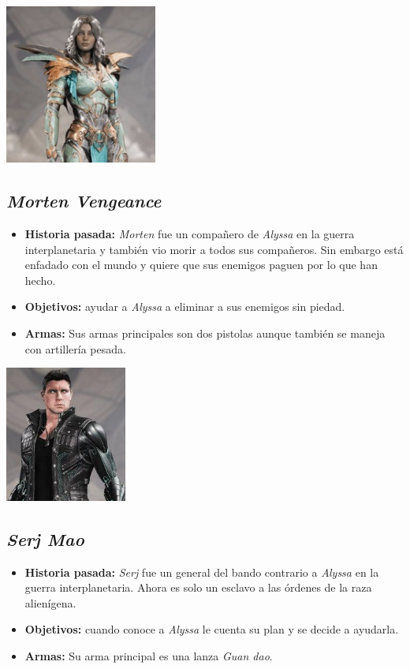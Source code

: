 \documentclass[twoside]{article}
\begin{document}
\begin{center}
\includegraphics[width=5cm]{./images/alyssa.jpg}
\end{center}

\subsection{\textit{Morten Vengeance}}
\begin{itemize}
\item \textbf{Historia pasada:} \textit{Morten} fue un compañero de \textit{Alyssa} en la guerra interplanetaria y también vio morir a todos sus compañeros. Sin embargo está enfadado con el mundo y quiere que sus enemigos paguen por lo que han hecho. 
\item \textbf{Objetivos:} ayudar a \textit{Alyssa} a eliminar a sus enemigos sin piedad. 
\item \textbf{Armas:} Sus armas principales son dos pistolas aunque también se maneja con artillería pesada. 
\end{itemize}

\begin{center}
\includegraphics[width=4cm]{./images/morten.jpg}
\end{center}

\subsection{\textit{Serj Mao}}
\begin{itemize}
\item \textbf{Historia pasada:} \textit{Serj} fue un general del bando contrario a \textit{Alyssa} en la guerra interplanetaria. Ahora es solo un esclavo a las órdenes de la raza alienígena.
\item \textbf{Objetivos:} cuando conoce a \textit{Alyssa} le cuenta su plan y se decide a ayudarla. 
\item \textbf{Armas:} Su arma principal es una lanza \textit{Guan dao}.
\end{itemize}
\end{document}
